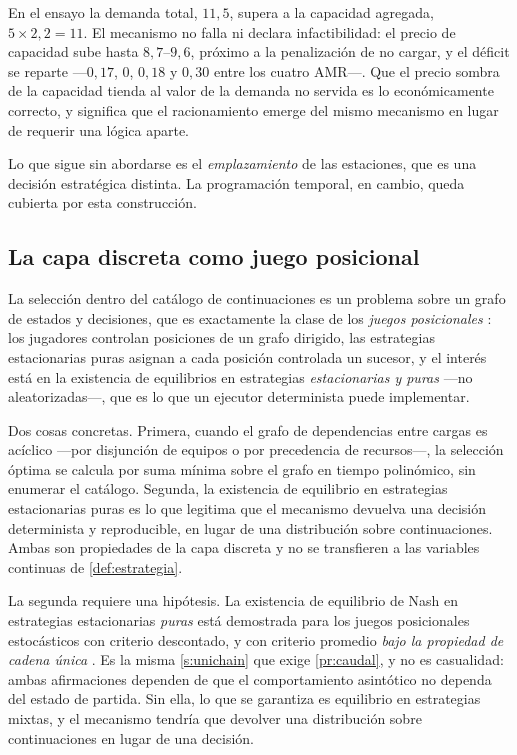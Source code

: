 \begin{observacion}
\label{obs:racionamiento}
En el ensayo la demanda total, $11{,}5$, supera a la capacidad agregada,
$5\times2{,}2=11$. El mecanismo no falla ni declara infactibilidad: el precio de
capacidad sube hasta $8{,}7$–$9{,}6$, próximo a la penalización de no cargar,
y el déficit se reparte —$0{,}17$, $0$, $0{,}18$ y $0{,}30$ entre los cuatro
AMR—. Que el precio sombra de la capacidad tienda al valor de la demanda no
servida es lo económicamente correcto, y significa que el racionamiento emerge
del mismo mecanismo en lugar de requerir una lógica aparte.

Lo que sigue sin abordarse es el \emph{emplazamiento} de las estaciones, que es
una decisión estratégica distinta. La programación temporal, en cambio, queda
cubierta por esta construcción.
\end{observacion}

\subsection{La capa discreta como juego posicional}

La selección dentro del catálogo de continuaciones es un problema sobre un grafo
de estados y decisiones, que es exactamente la clase de los \emph{juegos
posicionales} \cite{lozovanu2024positional}: los jugadores controlan posiciones
de un grafo dirigido, las estrategias estacionarias puras asignan a cada
posición controlada un sucesor, y el interés está en la existencia de
equilibrios en estrategias \emph{estacionarias y puras} —no aleatorizadas—,
que es lo que un ejecutor determinista puede implementar.

\begin{observacion}
\label{obs:posicional}
Dos cosas concretas. Primera, cuando el grafo de dependencias entre cargas es
acíclico —por disjunción de equipos o por precedencia de recursos—, la selección
óptima se calcula por suma mínima sobre el grafo en tiempo polinómico, sin
enumerar el catálogo. Segunda, la existencia de equilibrio en estrategias
estacionarias puras es lo que legitima que el mecanismo devuelva una decisión
determinista y reproducible, en lugar de una distribución sobre continuaciones.
Ambas son propiedades de la capa discreta y no se transfieren a las variables
continuas de \cref{def:estrategia}.

La segunda requiere una hipótesis. La
existencia de equilibrio de Nash en estrategias estacionarias \emph{puras} está
demostrada para los juegos posicionales estocásticos con criterio descontado, y
con criterio promedio \emph{bajo la propiedad de cadena única}
\cite{lozovanu2024positional}. Es la misma \cref{s:unichain} que exige
\cref{pr:caudal}, y no es casualidad: ambas afirmaciones dependen de que el
comportamiento asintótico no dependa del estado de partida. Sin ella, lo que se
garantiza es equilibrio en estrategias mixtas, y el mecanismo tendría que
devolver una distribución sobre continuaciones en lugar de una decisión.
\end{observacion}

